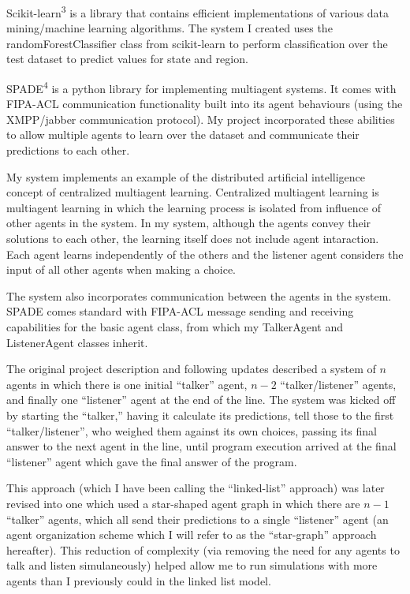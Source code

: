 \documentclass{article}
\begin{document}
\par
Scikit-learn\textsuperscript{3} is a library that contains efficient implementations of various data mining/machine learning algorithms. The system I created uses the randomForestClassifier class from scikit-learn to perform classification over the test dataset to predict values for state and region. 

\par
SPADE\textsuperscript{4} is a python library for implementing multiagent systems. It comes with FIPA-ACL communication functionality built into its agent behaviours (using the XMPP/jabber communication protocol). My project incorporated these abilities to allow multiple agents to learn over the dataset and communicate their predictions to each other.

\par
My system implements an example of the distributed artificial intelligence concept of centralized multiagent learning. Centralized multiagent learning is multiagent learning in which the learning process is isolated from influence of other agents in the system. In my system, although the agents convey their solutions to each other, the learning itself does not include agent intaraction. Each agent learns independently of the others and the listener agent considers the input of all other agents when making a choice. 
\par The system also incorporates communication between the agents in the system. SPADE comes standard with FIPA-ACL message sending and receiving capabilities for the basic agent class, from which my TalkerAgent and ListenerAgent classes inherit.
\par The original project description and following updates described a system of $n$ agents in which there is one initial ``talker'' agent, $n-2$ ``talker/listener'' agents, and finally one ``listener'' agent at the end of the line. The system was kicked off by starting the ``talker,'' having it calculate its predictions, tell those to the first ``talker/listener'', who weighed them against its own choices, passing its final answer to the next agent in the line, until program execution arrived at the final ``listener'' agent which gave the final answer of the program. 
\par This approach (which I have been calling the ``linked-list'' approach) was later revised into one which used a star-shaped agent graph in which there are $n-1$ ``talker'' agents, which all send their predictions to a single ``listener'' agent (an agent organization scheme which I will refer to as the ``star-graph'' approach hereafter). This reduction of complexity (via removing the need for any agents to talk and listen simulaneously) helped allow me to run simulations with more agents than I previously could in the linked list model.
\end{document}
